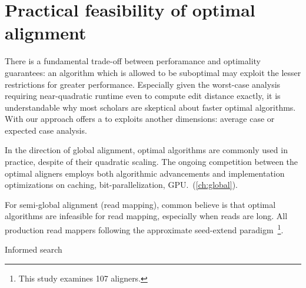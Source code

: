 \section{Practical feasibility of optimal alignment}

There is a fundamental trade-off between perforamance and optimality guarantees:
an algorithm which is allowed to be suboptimal may exploit the lesser
restrictions for greater performance. Especially given the worst-case analysis
requiring near-quadratic runtime even to compute edit distance exactly, it is
understandable why most scholars are skeptical about faster optimal algorithms.
With our \A approach  offers a to exploits another dimensions: average case or expected case analysis.


In the direction of global alignment, optimal algorithms are commonly used in
practice, despite of their quadratic scaling. The ongoing competition between
the optimal aligners employs both algorithmic advancements and implementation
optimizations on caching, bit-parallelization, GPU.~(\cref{ch:global}).

For semi-global alignment (read mapping), common believe is that optimal
algorithms are infeasible for read mapping, especially when reads are long. All
production read mappers following the approximate seed-extend
paradigm~\cite{alser2021technology}\footnote{This study examines 107 aligners.}.

Informed search